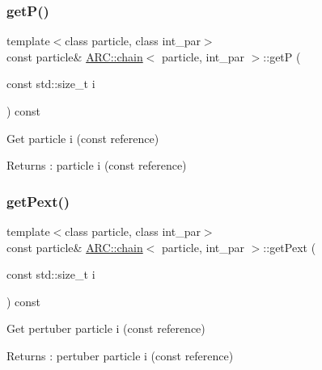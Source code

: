 \subsubsection{\texorpdfstring{get\+P()}{getP()}}
{\footnotesize\ttfamily template$<$class particle, class int\+\_\+par$>$ \\
const particle\& \hyperlink{classARC_1_1chain}{A\+R\+C\+::chain}$<$ particle, int\+\_\+par $>$\+::getP (\begin{DoxyParamCaption}\item[{const std\+::size\+\_\+t}]{i }\end{DoxyParamCaption}) const\hspace{0.3cm}{\ttfamily [inline]}}



Get particle i (const reference) 

\begin{DoxyReturn}{Returns}
\+: particle i (const reference) 
\end{DoxyReturn}
\hypertarget{classARC_1_1chain_a992795e009faf43b59fc338350ae210c}{}\label{classARC_1_1chain_a992795e009faf43b59fc338350ae210c} 
\subsubsection{\texorpdfstring{get\+Pext()}{getPext()}}
{\footnotesize\ttfamily template$<$class particle, class int\+\_\+par$>$ \\
const particle\& \hyperlink{classARC_1_1chain}{A\+R\+C\+::chain}$<$ particle, int\+\_\+par $>$\+::get\+Pext (\begin{DoxyParamCaption}\item[{const std\+::size\+\_\+t}]{i }\end{DoxyParamCaption}) const\hspace{0.3cm}{\ttfamily [inline]}}



Get pertuber particle i (const reference) 

\begin{DoxyReturn}{Returns}
\+: pertuber particle i (const reference) 
\end{DoxyReturn}
\hypertarget{classARC_1_1chain_ade5db39891ff7a2d10ac38786ab866c1}{}\label{classARC_1_1chain_ade5db39891ff7a2d10ac38786ab866c1} 
